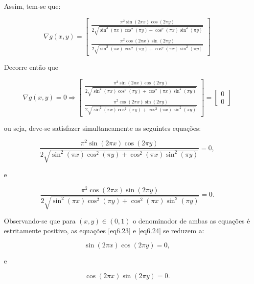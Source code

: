 Assim, tem-se que:


\begin{equation}
	\nabla g(x, y) = \begin{bmatrix}
		\frac{\pi^2 \sin(2\pi x) \cos(2\pi y)}{2\sqrt{\sin^2(\pi x) \cos^2(\pi y) + \cos^2(\pi x) \sin^2(\pi y)}} \\
		\frac{\pi^2 \cos(2\pi x) \sin(2\pi y)}{2\sqrt{\sin^2(\pi x) \cos^2(\pi y) + \cos^2(\pi x) \sin^2(\pi y)}}
	\end{bmatrix}
\end{equation}

Decorre então que

\begin{equation}
	\nabla g(x,y) = 0 \Rightarrow \begin{bmatrix}
		\frac{\pi^2 \sin(2\pi x) \cos(2\pi y)}{2\sqrt{\sin^2(\pi x) \cos^2(\pi y) + \cos^2(\pi x) \sin^2(\pi y)}}\\
		\frac{\pi^2 \cos(2\pi x) \sin(2\pi y)}{2\sqrt{\sin^2(\pi x) \cos^2(\pi y) + \cos^2(\pi x) \sin^2(\pi y)}}
	\end{bmatrix}
	=
	\begin{bmatrix}
		0 \\
		0
	\end{bmatrix}
\end{equation}

ou seja, deve-se satisfazer simultaneamente as seguintes equações:

\begin{equation}\label{eq6.23}
	\frac{\pi^2 \sin(2\pi x) \cos(2\pi y)}{2\sqrt{\sin^2(\pi x) \cos^2(\pi y) + \cos^2(\pi x) \sin^2(\pi y)}}= 0,
\end{equation}

e

\begin{equation}\label{eq6.24}
	\frac{\pi^2 \cos(2\pi x) \sin(2\pi y)}{2\sqrt{\sin^2(\pi x) \cos^2(\pi y) + \cos^2(\pi x) \sin^2(\pi y)}}= 0.
\end{equation}

Observando-se que para $ (x,y) \in (0,1) $ o denominador de ambas as equações é estritamente positivo, as equações \ref{eq6.23} e \ref{eq6.24} se reduzem a:

\begin{equation}\label{eq6.25}
	\sin(2\pi x) \cos(2\pi y)= 0,
\end{equation}

e

\begin{equation}\label{eq6.26}
	\cos(2\pi x) \sin(2\pi y)= 0.
\end{equation}

